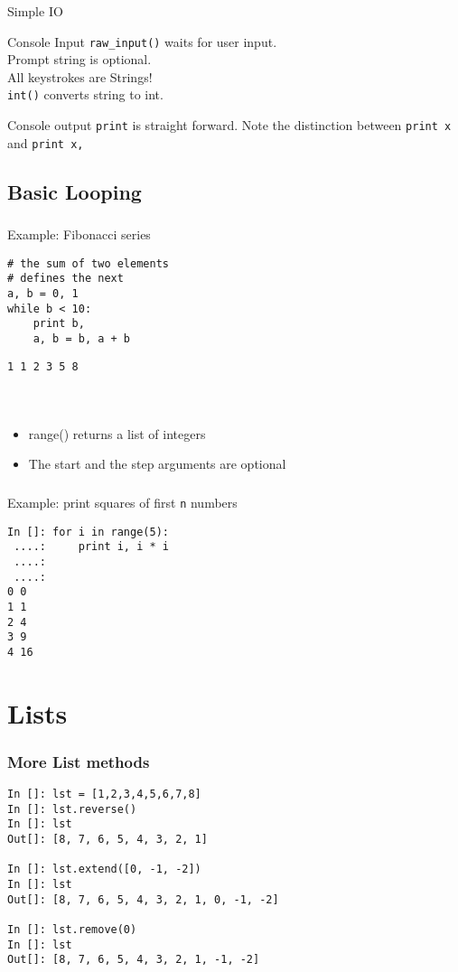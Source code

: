 \documentclass[14pt,compress]{beamer}
\newcounter{time}
\newcommand{\inctime}[1]{\addtocounter{time}{#1}{\tiny \thetime\ m}}
\newcommand{\typ}[1]{\texttt{#1}}
\newcommand{\kwrd}[1]{ \texttt{\textbf{\color{blue}{#1}}}  }
\begin{document}
\begin{frame}{Simple IO}
  \begin{block}
    {Console Input}
    \texttt{raw\_input()} waits for user input.\\Prompt string is optional.\\
    All keystrokes are Strings!\\\texttt{int()} converts string to int.
  \end{block}
  \begin{block}
    {Console output}
    \texttt{print} is straight forward. Note the distinction between \texttt{print x} and \texttt{print x,}
  \end{block}
\end{frame}

\subsection{Basic Looping}
\begin{frame}[fragile]
  \frametitle{\kwrd{while}}
Example: Fibonacci series
  \begin{lstlisting}
# the sum of two elements
# defines the next
a, b = 0, 1
while b < 10:
    print b,
    a, b = b, a + b 
\end{lstlisting}
\typ{1 1 2 3 5 8}\\  
\end{frame}

\begin{frame}[fragile]
\frametitle{\kwrd{range()}}
\kwrd{range([start,] stop[, step])}\\
\begin{itemize}
  \item \alert {range() returns a list of integers}
  \item \alert {The start and the step arguments are optional}  
\end{itemize}
\end{frame}

\begin{frame}[fragile]
  \frametitle{\kwrd{for}}
Example: print squares of first \typ{n} numbers
  \begin{lstlisting}
In []: for i in range(5):
 ....:     print i, i * i
 ....:     
 ....:     
0 0
1 1
2 4
3 9
4 16
\end{lstlisting}
\inctime{15}
\end{frame}

\section{Lists}
\begin{frame}[fragile]
\frametitle{More List methods}
\begin{lstlisting}
In []: lst = [1,2,3,4,5,6,7,8]
In []: lst.reverse()
In []: lst
Out[]: [8, 7, 6, 5, 4, 3, 2, 1]

In []: lst.extend([0, -1, -2])
In []: lst
Out[]: [8, 7, 6, 5, 4, 3, 2, 1, 0, -1, -2]

In []: lst.remove(0)
In []: lst
Out[]: [8, 7, 6, 5, 4, 3, 2, 1, -1, -2]
\end{lstlisting}
\end{frame}
\end{document}
